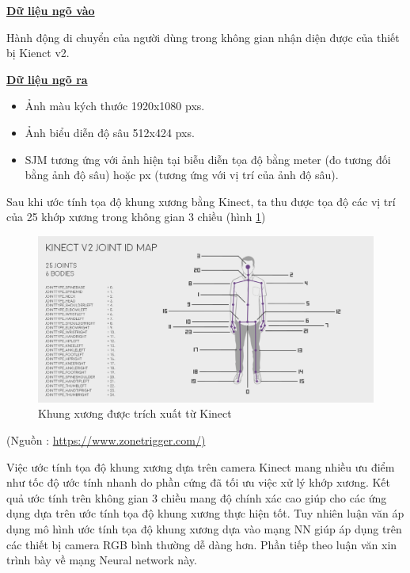 \underline{\textbf{Dữ liệu ngõ vào}}

Hành động di chuyển của người dùng trong không gian nhận diện được của thiết bị Kienct v2.

\underline{\textbf{Dữ liệu ngõ ra}}
\begin{itemize}
\item Ảnh màu kých thước 1920x1080 pxs.

\item Ảnh biểu diễn độ sâu 512x424 pxs.

\item SJM tương ứng với ảnh hiện tại biễu diễn tọa độ bằng meter (đo tương đối bằng ảnh độ sâu) hoặc px (tương ứng với vị trí của ảnh độ sâu).
\end{itemize}

Sau khi ước tính tọa độ khung xương bằng Kinect, ta thu được tọa độ các vị trí của 25 khớp xương trong không gian 3 chiều (hình \ref{fig:skeleton_kinect})

\FloatBarrier
\begin{figure}[htp]
\begin{center}
\includegraphics[scale=0.4]{chap3/c3_figs/kinectskeleton.png}
\end{center}
\caption{Khung xương được trích xuất từ Kinect}
\label{fig:skeleton_kinect}
\end{figure}
\FloatBarrier
\centerline{(Nguồn : \url{https://www.zonetrigger.com/)}}
Việc ước tính tọa độ khung xương dựa trên camera Kinect mang nhiều ưu điểm như tốc độ ước tính nhanh do phần cứng đã tối ưu việc xử lý khớp xương. Kết quả ước tính trên không gian 3 chiều mang độ chính xác cao giúp cho các ứng dụng dựa trên ước tính tọa độ khung xương thực hiện tốt. Tuy nhiên luận văn áp dụng mô hình ước tính tọa độ khung xương dựa vào mạng NN giúp áp dụng trên các thiết bị camera RGB bình thường dễ dàng hơn. Phần tiếp theo luận văn xin trình bày về mạng Neural network này.

